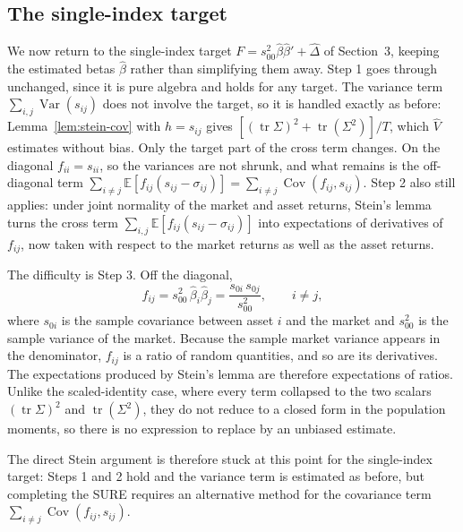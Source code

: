 \subsection{The single-index target}

We now return to the single-index target $F = s_{00}^2\hat\beta\hat\beta' + \hat\Delta$ of Section~3, keeping the estimated betas $\hat\beta$ rather than simplifying them away. Step 1 goes through unchanged, since it is pure algebra and holds for any target. The variance term $\sum_{i,j}\operatorname{Var}(s_{ij})$ does not involve the target, so it is handled exactly as before: Lemma~\ref{lem:stein-cov} with $h = s_{ij}$ gives $[(\operatorname{tr}\Sigma)^2 + \operatorname{tr}(\Sigma^2)]/T$, which $\hat V$ estimates without bias. Only the target part of the cross term changes. On the diagonal $f_{ii} = s_{ii}$, so the variances are not shrunk, and what remains is the off-diagonal term $\sum_{i \neq j}\mathbb{E}[f_{ij}(s_{ij} - \sigma_{ij})] = \sum_{i \neq j}\operatorname{Cov}(f_{ij}, s_{ij})$. Step 2 also still applies: under joint normality of the market and asset returns, Stein's lemma turns the cross term $\sum_{i,j}\mathbb{E}[f_{ij}(s_{ij} - \sigma_{ij})]$ into expectations of derivatives of $f_{ij}$, now taken with respect to the market returns as well as the asset returns.

The difficulty is Step 3. Off the diagonal,
\[
  f_{ij} = s_{00}^2\,\hat\beta_i\hat\beta_j = \frac{s_{0i}\,s_{0j}}{s_{00}^2}, \qquad i \neq j,
\]
where $s_{0i}$ is the sample covariance between asset $i$ and the market and $s_{00}^2$ is the sample variance of the market. Because the sample market variance appears in the denominator, $f_{ij}$ is a ratio of random quantities, and so are its derivatives. The expectations produced by Stein's lemma are therefore expectations of ratios. Unlike the scaled-identity case, where every term collapsed to the two scalars $(\operatorname{tr}\Sigma)^2$ and $\operatorname{tr}(\Sigma^2)$, they do not reduce to a closed form in the population moments, so there is no expression to replace by an unbiased estimate.

The direct Stein argument is therefore stuck at this point for the single-index target: Steps 1 and 2 hold and the variance term is estimated as before, but completing the SURE requires an alternative method for the covariance term $\sum_{i \neq j}\operatorname{Cov}(f_{ij}, s_{ij})$.
